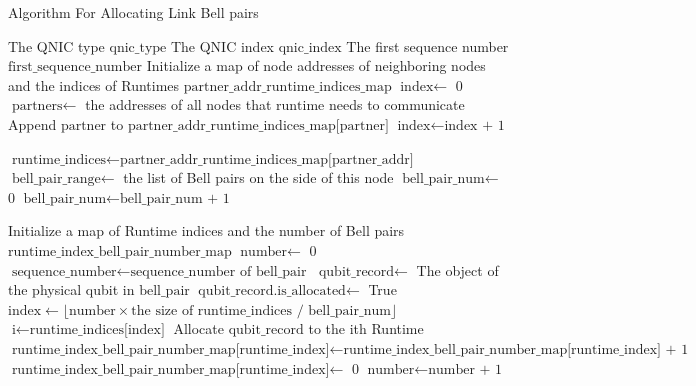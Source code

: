 \begin{algorithm}[H]  
  \caption{Algorithm For Allocating Link Bell pairs}                 
  \begin{algorithmic}[1]
    \Require The QNIC type $\text{qnic\_type}$
    \Require The QNIC index $\text{qnic\_index}$
    \Require The first sequence number $\text{first\_sequence\_number}$
    \State Initialize a map of node addresses of neighboring nodes and the indices of Runtimes $\text{partner\_addr\_runtime\_indices\_map}$
    \State $\text{index} \gets$ 0
      \State $\text{partners} \gets$ the addresses of all nodes that $\text{runtime}$ needs to communicate
        \State Append $\text{partner}$ to $\text{partner\_addr\_runtime\_indices\_map[partner]}$
      \EndFor
      \State $\text{index} \gets \text{index + 1}$
    \EndFor

      \State $\text{runtime\_indices} \gets \text{partner\_addr\_runtime\_indices\_map[partner\_addr]}$
      \State $\text{bell\_pair\_range} \gets$ the list of Bell pairs on the side of this node
      \State $\text{bell\_pair\_num} \gets$ 0
        \State $\text{bell\_pair\_num} \gets \text{bell\_pair\_num + 1}$
      \EndFor

      \State  Initialize a map of Runtime indices and the number of Bell pairs $\text{runtime\_index\_bell\_pair\_number\_map}$
      \State $\text{number} \gets$ 0
        \State $\text{sequence\_number} \gets \text{sequence\_number of bell\_pair}$
          \State $\text{qubit\_record} \gets$ The object of the physical qubit in $\text{bell\_pair}$
            \State $\text{qubit\_record.is\_allocated} \gets$ True
            \State $\text{index} \gets \lfloor \text{number} \times \text{the size of runtime\_indices / bell\_pair\_num} \rfloor$
            \State $\text{i} \gets \text{runtime\_indices[index]}$
            \State Allocate $\text{qubit\_record}$ to the ith Runtime
              \State $\text{runtime\_index\_bell\_pair\_number\_map[runtime\_index]} \gets \text{runtime\_index\_bell\_pair\_number\_map[runtime\_index] + 1}$
            \Else
              \State $\text{runtime\_index\_bell\_pair\_number\_map[runtime\_index]} \gets$ 0
            \EndIf
          \EndIf
        \EndIf
        \State $\text{number} \gets \text{number + 1}$
      \EndFor
    \EndFor
  \end{algorithmic}
\end{algorithm}

